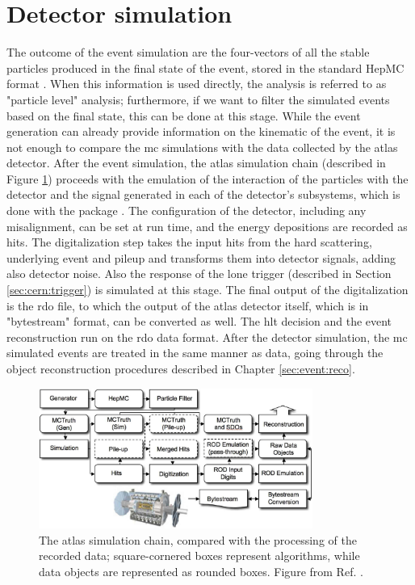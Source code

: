 \section{Detector simulation}
\label{sec:detsim}

The outcome of the event simulation are the four-vectors of all the stable particles produced in the final state of the event, stored in the standard HepMC format \cite{Dobbs:2001ck}.
When this information is used directly, the analysis is referred to as "particle level" analysis; furthermore, if we want to filter the simulated events based on the final state, this can be done at this stage. 
While the event generation can already provide information on the kinematic of the event, it is not enough to compare the \gls{mc} simulations with the 
data collected by the \gls{atlas} detector. 
After the event simulation, the \gls{atlas} simulation chain \cite{Aad:2010ah} (described in Figure \ref{fig:sim:chain}) proceeds with the emulation of the
interaction of the particles with the detector and the signal generated in each of the detector's subsystems, 
which is done with the \geant package \cite{Agostinelli:2002hh}. The configuration of the detector, including any misalignment, can be set at run time, and the energy depositions are recorded as hits. The digitalization step takes the input hits from the hard scattering, underlying event and pileup and transforms them into detector signals, adding also detector noise. Also the response of the \gls{lone} trigger (described in Section \ref{sec:cern:trigger}) is simulated at this stage. The final output of the digitalization is the \gls{rdo} file, to which the output of the \gls{atlas} detector itself, which is in "bytestream" format, can be converted as well. The \gls{hlt} decision and the event reconstruction run on the \gls{rdo} data format. After the detector simulation, the \gls{mc} simulated events are treated in the same manner as data, going through the object reconstruction procedures
described in Chapter \ref{sec:event:reco}.

\begin{figure}[h]
\begin{center}
    \includegraphics[width=0.8\textwidth]{figures/simul/outline_v2}
\end{center}
\caption{The \gls{atlas} simulation chain, compared with the processing of the recorded data; square-cornered boxes represent algorithms, while data objects are represented as rounded boxes. Figure from Ref. \cite{Aad:2010ah}.}
 \label{fig:sim:chain}
\end{figure}

